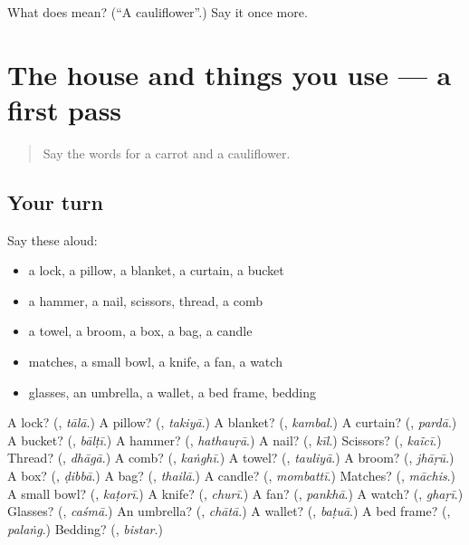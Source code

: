 \begin{tcolorbox}[breakable,colback=teal!4,colframe=teal!35!black,title={Before you move on}]
What does  mean? (\textquotedblleft{}A cauliflower\textquotedblright{}.) Say it once more.
\end{tcolorbox}
\section[(dialogue)]{The house and things you use — a first pass}

\label{lesson:HI-R138-first-pass-the-house-and-things-you-use}



\begin{quote}
Say the words for a carrot and a cauliflower.
\end{quote}

\subsection*{Your turn}
Say these aloud:

\begin{itemize}
\raggedright
  \item a lock, a pillow, a blanket, a curtain, a bucket
  \item a hammer, a nail, scissors, thread, a comb
  \item a towel, a broom, a box, a bag, a candle
  \item matches, a small bowl, a knife, a fan, a watch
  \item glasses, an umbrella, a wallet, a bed frame, bedding
\end{itemize}

\begin{tcolorbox}[breakable,colback=teal!4,colframe=teal!35!black,title={Before you move on}]
A lock? (\textbf{}, \emph{tālā}.) A pillow? (\textbf{}, \emph{takiyā}.) A blanket? (\textbf{}, \emph{kambal}.) A curtain? (\textbf{}, \emph{pardā}.) A bucket? (\textbf{}, \emph{bālṭī}.) A hammer? (\textbf{}, \emph{hathauṛā}.) A nail? (\textbf{}, \emph{kīl}.) Scissors? (\textbf{}, \emph{kaĩcī}.) Thread? (\textbf{}, \emph{dhāgā}.) A comb? (\textbf{}, \emph{kaṅghī}.) A towel? (\textbf{}, \emph{tauliyā}.) A broom? (\textbf{}, \emph{jhāṛū}.) A box? (\textbf{}, \emph{ḍibbā}.) A bag? (\textbf{}, \emph{thailā}.) A candle? (\textbf{}, \emph{mombattī}.) Matches? (\textbf{}, \emph{māchis}.) A small bowl? (\textbf{}, \emph{kaṭorī}.) A knife? (\textbf{}, \emph{churī}.) A fan? (\textbf{}, \emph{pankhā}.) A watch? (\textbf{}, \emph{ghaṛī}.) Glasses? (\textbf{}, \emph{caśmā}.) An umbrella? (\textbf{}, \emph{chātā}.) A wallet? (\textbf{}, \emph{baṭuā}.) A bed frame? (\textbf{}, \emph{palaṅg}.) Bedding? (\textbf{}, \emph{bistar}.)
\end{tcolorbox}
